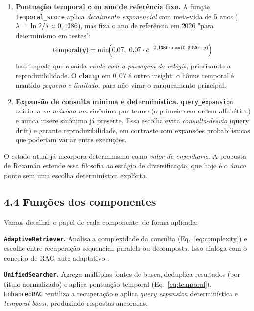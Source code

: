 \begin{enumerate}[label=\arabic*.]
  \item \textbf{Pontuação temporal com ano de referência fixo.} A função
        \texttt{temporal\_score} aplica \emph{decaimento exponencial} com meia-vida
        de 5 anos ($\lambda = \ln 2 / 5 \approx 0{,}1386$), mas fixa o ano de
        referência em 2026 "para determinismo em testes":
        \begin{equation}
        \label{eq:temporal}
        \text{temporal}(y) = \min\!\Bigl(0{,}07,\;
        0{,}07 \cdot e^{-0{,}1386 \cdot \max(0,\,2026-y)}\Bigr)
        \end{equation}
        Isso impede que a saída \emph{mude com a passagem do relógio}, priorizando a
        reprodutibilidade. O \textbf{clamp} em $0{,}07$ é outro insight: o bônus
        temporal é mantido \emph{pequeno e limitado}, para não virar o ranqueamento
        principal.
  \item \textbf{Expansão de consulta mínima e determinística.}
        \texttt{query\_expansion} adiciona \emph{no máximo um} sinônimo por termo
        (o primeiro em ordem alfabética) e nunca insere sinônimo já presente.
        Essa escolha evita \emph{consulta-desvio} (query drift) e garante
        reproduzibilidade, em contraste com expansões probabilísticas que poderiam
        variar entre execuções.
\end{enumerate}

\begin{pontochave}
O estado atual já incorpora determinismo como \emph{valor de engenharia}. A
proposta de Recamán estende essa filosofia ao estágio de diversificação, que hoje
é o \emph{único} ponto sem uma escolha determinística explícita.
\end{pontochave}

\subsection*{4.4 Funções dos componentes}

 Vamos detalhar o papel de cada componente, de forma aplicada:

\noindent\textbf{\texttt{AdaptiveRetriever}.} Analisa a complexidade da consulta
(Eq.~\ref{eq:complexity}) e escolhe entre recuperação sequencial, paralela ou
decomposta. Isso dialoga com o conceito de RAG auto-adaptativo
\cite{Jeong2024AdaptiveRAG}.

\noindent\textbf{\texttt{UnifiedSearcher}.} Agrega múltiplas fontes de busca,
deduplica resultados (por título normalizado) e aplica pontuação temporal
(Eq.~\ref{eq:temporal}). \texttt{EnhancedRAG} reutiliza a recuperação e aplica
\emph{query expansion} determinística e \emph{temporal boost}, produzindo
respostas ancoradas.

